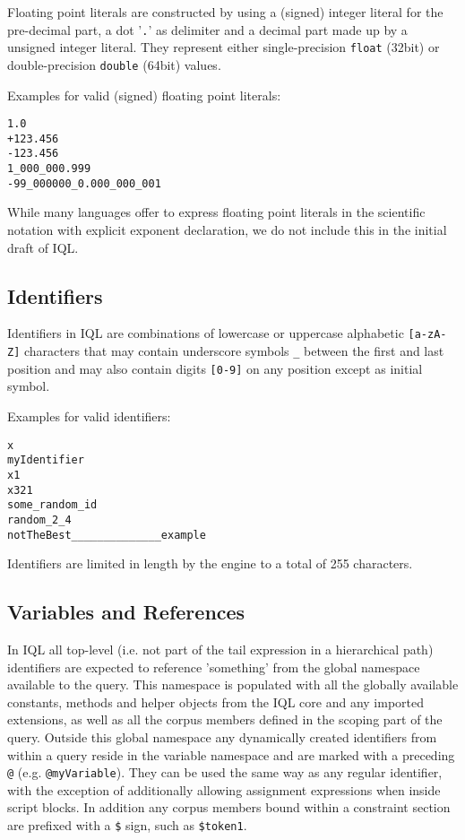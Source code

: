 \documentclass[11pt]{article}
\begin{document}
Floating point literals are constructed by using a (signed) integer literal for the pre-decimal part, a dot '\texttt{.}' as delimiter and a decimal part made up by a unsigned integer literal. They represent either single-precision \texttt{float} (32bit) or double-precision \texttt{double} (64bit) values.

Examples for valid (signed) floating point literals:

\begin{verbatim}
1.0
+123.456
-123.456
1_000_000.999
-99_000000_0.000_000_001
\end{verbatim}

While many languages offer to express floating point literals in the scientific notation with explicit exponent declaration, we do not include this in the initial draft of IQL.

\subsection{Identifiers}
\label{sec:identifiers}

Identifiers in IQL are combinations of lowercase or uppercase alphabetic \texttt{[a-zA-Z]} characters that may contain underscore symbols \texttt{\_} between the first and last position and may also contain digits \texttt{[0-9]} on any position except as initial symbol.

Examples for valid identifiers:

\begin{verbatim}
x
myIdentifier
x1
x321
some_random_id
random_2_4
notTheBest______________example
\end{verbatim}

Identifiers are limited in length by the engine to a total of 255 characters. 

\subsection{Variables and References}
\label{sec:variables-references}

In IQL all top-level (i.e. not part of the tail expression in a hierarchical path) identifiers are expected to reference 'something' from the global namespace available to the query. This namespace is populated with all the globally available constants, methods and helper objects from the IQL core and any imported extensions, as well as all the corpus members defined in the scoping part of the query. Outside this global namespace any dynamically created identifiers from within a query reside in the variable namespace and are marked with a preceding \texttt{@} (e.g. \texttt{@myVariable}). They can be used the same way as any regular identifier, with the exception of additionally allowing assignment expressions when inside script blocks. In addition any corpus members bound within a constraint section are prefixed with a \texttt{\$} sign, such as \texttt{\$token1}.
\end{document}
